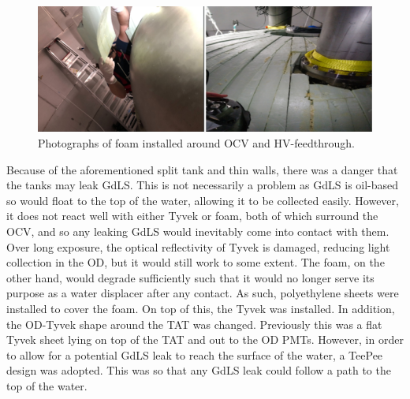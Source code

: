\begin{figure}[!tbph]
\centering
\includegraphics[width=\linewidth]{Figures/Construction/TAT_foam_installation_merged_images.png}
\caption{Photographs of foam installed around OCV and HV-feedthrough.}
\label{fig:Additional_foam_installation}
\end{figure}

\par
Because of the aforementioned split tank and thin walls, there was a danger that the tanks may leak GdLS.
This is not necessarily a problem as GdLS is oil-based so would float to the top of the water, allowing it to be collected easily.
However, it does not react well with either Tyvek or foam, both of which surround the OCV, and so any leaking GdLS would inevitably come into contact with them.
Over long exposure, the optical reflectivity of Tyvek is damaged, reducing light collection in the OD, but it would still work to some extent.
The foam, on the other hand, would degrade sufficiently such that it would no longer serve its purpose as a water displacer after any contact.
As such, polyethylene sheets were installed to cover the foam.
On top of this, the Tyvek was installed.
In addition, the OD-Tyvek shape around the TAT was changed.
Previously this was a flat Tyvek sheet lying on top of the TAT and out to the OD PMTs.
However, in order to allow for a potential GdLS leak to reach the surface of the water, a TeePee design was adopted.
This was so that any GdLS leak could follow a path to the top of the water.

